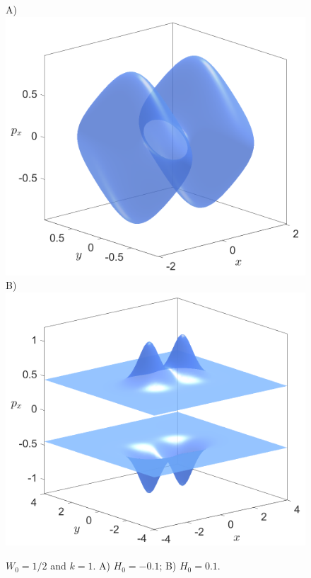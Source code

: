 \documentclass[10pt,aps,onecolumn,superscriptaddress]{revtex4-2}
\begin{document}
\begin{figure}[htbp]
	A)\includegraphics[scale=0.28]{energySurf_H_-01.png}
	B)\includegraphics[scale=0.28]{energySurf_H_01.png}
	\caption{$W_0 = 1/2$ and $k = 1$. A) $H_0 = -0.1$; B) $H_0 = 0.1$.}
	\label{fig:vdw-energyHyp}
\end{figure}
\end{document}
